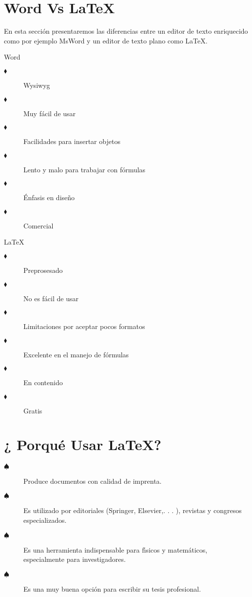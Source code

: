 \section{Word Vs \LaTeX}
\bigskip
En esta secci\'on presentaremos las diferencias entre un editor de texto enriquecido  como por ejemplo MsWord y un editor de texto plano como \LaTeX.\\
\begin{minipage}[t]{0.4\linewidth}
\begin{center}
Word
\end{center}
\begin{description}
\item[$\blacklozenge$] Wysiwyg
\item[$\blacklozenge$] Muy f\'{a}cil de usar
\item[$\blacklozenge$] Facilidades para insertar objetos
\item[$\blacklozenge$] Lento y malo para trabajar con f\'{o}rmulas
\item[$\blacklozenge$] \'Enfasis en dise\~{n}o
\item[$\blacklozenge$] Comercial
\end{description}
\end{minipage}%
\hfill
\begin{minipage}[t]{0.4\linewidth}
\begin{center}
\LaTeX
\end{center}
\begin{description}
\item[$\blacklozenge$] Preprosesado
\item[$\blacklozenge$] No es f\'{a}cil de usar
\item[$\blacklozenge$] Limitaciones por aceptar pocos formatos
\item[$\blacklozenge$] Excelente en el manejo de f\'{o}rmulas
\item[$\blacklozenge$] En contenido
\item[$\blacklozenge$] Gratis
\end{description}
\end{minipage}


\section{¿ Porqu\'{e} Usar \LaTeX ?}
\begin{description}
\item[$\spadesuit$] Produce documentos con calidad de imprenta.

\item[$\spadesuit$] Es utilizado por editoriales (Springer, Elsevier,. . . ),
revistas y congresos especializados.

\item[$\spadesuit$] Es una herramienta indispensable para f\'{\i}sicos y
matem\'{a}ticos, especialmente para investigadores.

\item[$\spadesuit$] Es una muy buena opci\'{o}n para escribir su tesis profesional.
\end{description}

